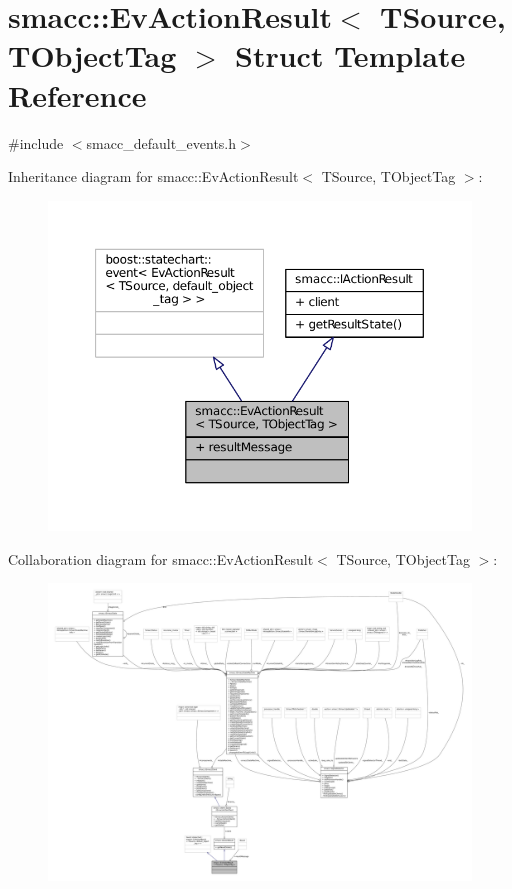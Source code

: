 \hypertarget{structsmacc_1_1EvActionResult}{}\section{smacc\+:\+:Ev\+Action\+Result$<$ T\+Source, T\+Object\+Tag $>$ Struct Template Reference}
\label{structsmacc_1_1EvActionResult}


{\ttfamily \#include $<$smacc\+\_\+default\+\_\+events.\+h$>$}



Inheritance diagram for smacc\+:\+:Ev\+Action\+Result$<$ T\+Source, T\+Object\+Tag $>$\+:
\nopagebreak
\begin{figure}[H]
\begin{center}
\leavevmode
\includegraphics[width=350pt]{structsmacc_1_1EvActionResult__inherit__graph}
\end{center}
\end{figure}


Collaboration diagram for smacc\+:\+:Ev\+Action\+Result$<$ T\+Source, T\+Object\+Tag $>$\+:
\nopagebreak
\begin{figure}[H]
\begin{center}
\leavevmode
\includegraphics[width=350pt]{structsmacc_1_1EvActionResult__coll__graph}
\end{center}
\end{figure}
